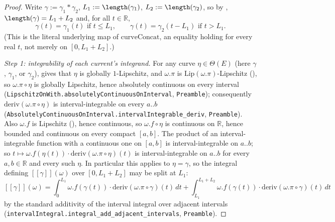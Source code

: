 \begin{proof}
  Write $\gamma := \gamma_1 * \gamma_2$, $L_1 := \length(\gamma_1)$, $L_2 := \length(\gamma_2)$, so
  by , $\length(\gamma) = L_1+L_2$ and, for all $t \in \mathbb{R}$,
  \[
    \gamma(t) = \gamma_1(t) \text{ if } t \le L_1
    , \qquad
    \gamma(t) = \gamma_2(t-L_1) \text{ if } t > L_1
    . \tag{$\ast$}
  \]
  (This is the literal underlying map of $\mathrm{curveConcat}$, an equality holding for every real
  $t$, not merely on $[0,L_1+L_2]$.)

  \emph{Step 1: integrability of each current's integrand.} For any curve $\eta \in \Theta(E)$
  (here $\gamma$, $\gamma_1$, or $\gamma_2$),  gives that $\eta$ is globally
  $1$-Lipschitz, and $\omega.\pi$ is $\mathrm{Lip}(\omega.\pi)$-Lipschitz (), so
  $\omega.\pi \circ \eta$ is globally Lipschitz, hence absolutely continuous on every interval
  (\texttt{LipschitzOnWith.absolutelyContinuousOnInterval}, \texttt{Preamble}); consequently
  $\mathrm{deriv}(\omega.\pi\circ\eta)$ is interval-integrable on every $a..b$
  (\texttt{AbsolutelyContinuousOnInterval.intervalIntegrable\_deriv}, \texttt{Preamble}). Also
  $\omega.f$ is Lipschitz (), hence continuous, so $\omega.f \circ \eta$ is
  continuous on $\mathbb{R}$, hence bounded and continuous on every compact $[a,b]$. The product of
  an interval-integrable function with a continuous one on $[a,b]$ is interval-integrable on $a..b$;
  so $t \mapsto \omega.f(\eta(t)) \cdot \mathrm{deriv}(\omega.\pi\circ\eta)(t)$ is interval-integrable
  on $a..b$ for every $a,b\in\mathbb{R}$ and every such $\eta$. In particular this applies to
  $\eta=\gamma$, so the integral defining $[[\gamma]](\omega)$ over $[0,L_1+L_2]$ may be split at
  $L_1$:
  \[
    [[\gamma]](\omega)
    = \int_0^{L_1} \omega.f(\gamma(t)) \cdot \mathrm{deriv}(\omega.\pi\circ\gamma)(t)\,dt
    + \int_{L_1}^{L_1+L_2} \omega.f(\gamma(t)) \cdot \mathrm{deriv}(\omega.\pi\circ\gamma)(t)\,dt
    \tag{1}
  \]
  by the standard additivity of the interval integral over adjacent intervals
  (\texttt{intervalIntegral.integral\_add\_adjacent\_intervals}, \texttt{Preamble}).


\end{proof}
